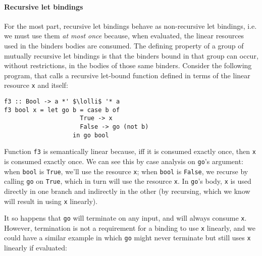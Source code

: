 \documentclass[acmsmall,review,anonymous]{acmart}
\newcommand{\incode}[1]{\lstinline{#1}}
\newcommand{\lolli}{\multimap}
\begin{document}
\paragraph{Recursive let bindings\label{sec:semantic-linearity-examples:recursive-lets}}
For the most part,
recursive let bindings behave as non-recursive let bindings, i.e. we must use them \emph{at
most once} because, when evaluated, the linear resources used in the binders
bodies are consumed. The defining property of a group of mutually recursive let
bindings is that the binders bound in that group can occur, without restrictions, in
the bodies of those same binders. %
Consider the following program, that calls a recursive let-bound function
defined in terms of the linear resource \incode{x} and itself:
%
\begin{notyet}
\begin{lstlisting}
f3 :: Bool -> a *' $\lolli$ '* a
f3 bool x = let go b = case b of
                     True -> x
                     False -> go (not b)
                   in go bool
\end{lstlisting}
\end{notyet}
%
Function \incode{f3} is semantically linear because, iff it is consumed exactly once,
then \incode{x} is consumed exactly once. We can see this by case analysis on \incode{go}'s argument:
when \incode{bool} is \incode{True}, we'll use the resource \incode{x};
 when \incode{bool} is \incode{False}, we recurse by calling \incode{go} on \incode{True}, which in turn will use the resource \incode{x}.
In \incode{go}'s body, \incode{x} is used directly in one branch and indirectly in the
other (by recursing, which we know will result in using \incode{x} linearly).
%

It so happens that \incode{go} will terminate on any input, and will always consume
\incode{x}. However, termination is not a requirement for a binding to use \incode{x} linearly,
and we could have a similar example in which \incode{go} might never terminate but still
uses \incode{x} linearly if evaluated:
\end{document}
